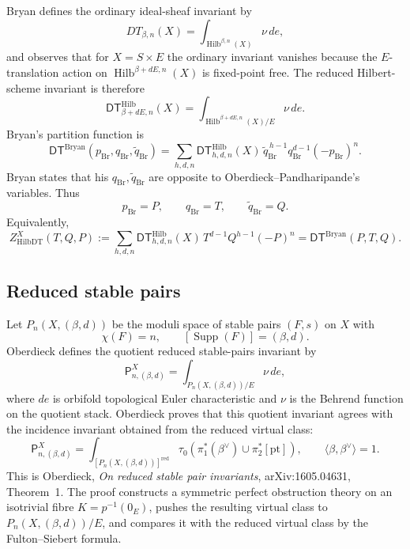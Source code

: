 Bryan defines the ordinary ideal-sheaf invariant by
\begin{equation}
\label{eq:rdtpt-bryan-ordinary}
DT_{\beta,n}(X)
=
\int_{\operatorname{Hilb}^{\beta,n}(X)}\nu\,de,
\end{equation}
and observes that for \(X=S\times E\) the ordinary invariant vanishes
because the \(E\)-translation action on
\(\operatorname{Hilb}^{\beta+dE,n}(X)\) is fixed-point free.  The reduced
Hilbert-scheme invariant is therefore
\begin{equation}
\label{eq:rdtpt-bryan-reduced}
\mathsf{DT}^{\mathrm{Hilb}}_{\beta+dE,n}(X)
=
\int_{\operatorname{Hilb}^{\beta+dE,n}(X)/E}\nu\,de.
\end{equation}
Bryan's partition function is
\begin{equation}
\label{eq:rdtpt-bryan-series}
\mathsf{DT}^{\mathrm{Bryan}}(p_{\mathrm{Br}},q_{\mathrm{Br}},
\widetilde q_{\mathrm{Br}})
=
\sum_{h,d,n}
\mathsf{DT}^{\mathrm{Hilb}}_{h,d,n}(X)\,
\widetilde q_{\mathrm{Br}}^{\,h-1}
q_{\mathrm{Br}}^{d-1}(-p_{\mathrm{Br}})^n.
\end{equation}
Bryan states that his \(q_{\mathrm{Br}},\widetilde q_{\mathrm{Br}}\)
are opposite to Oberdieck--Pandharipande's variables.  Thus
\begin{equation}
\label{eq:rdtpt-bryan-map}
p_{\mathrm{Br}}=P,\qquad
q_{\mathrm{Br}}=T,\qquad
\widetilde q_{\mathrm{Br}}=Q.
\end{equation}
Equivalently,
\begin{equation}
\label{eq:rdtpt-hilbdt-series}
Z^X_{\mathrm{HilbDT}}(T,Q,P)
:=
\sum_{h,d,n}
\mathsf{DT}^{\mathrm{Hilb}}_{h,d,n}(X)\,
T^{d-1}Q^{h-1}(-P)^n
=
\mathsf{DT}^{\mathrm{Bryan}}(P,T,Q).
\end{equation}

\subsection{Reduced stable pairs}

Let \(P_n(X,(\beta,d))\) be the moduli space of stable pairs
\((F,s)\) on \(X\) with
\[
\chi(F)=n,\qquad [\operatorname{Supp}(F)]=(\beta,d).
\]
Oberdieck defines the quotient reduced stable-pairs invariant by
\begin{equation}
\label{eq:rdtpt-pt-quotient}
\mathsf P^X_{n,(\beta,d)}
=
\int_{P_n(X,(\beta,d))/E}\nu\,de,
\end{equation}
where \(de\) is orbifold topological Euler characteristic and \(\nu\)
is the Behrend function on the quotient stack.  Oberdieck proves that
this quotient invariant agrees with the incidence invariant obtained
from the reduced virtual class:
\begin{equation}
\label{eq:rdtpt-pt-incidence}
\mathsf P^X_{n,(\beta,d)}
=
\int_{[P_n(X,(\beta,d))]^{\mathrm{red}}}
\tau_0\!\left(\pi_1^*(\beta^\vee)\cup\pi_2^*[\mathrm{pt}]\right),
\qquad
\langle\beta,\beta^\vee\rangle=1.
\end{equation}
This is Oberdieck, \emph{On reduced stable pair invariants},
arXiv:1605.04631, Theorem~1.  The proof constructs a symmetric perfect
obstruction theory on an isotrivial fibre \(K=p^{-1}(0_E)\), pushes the
resulting virtual class to \(P_n(X,(\beta,d))/E\), and compares it with
the reduced virtual class by the Fulton--Siebert formula.

